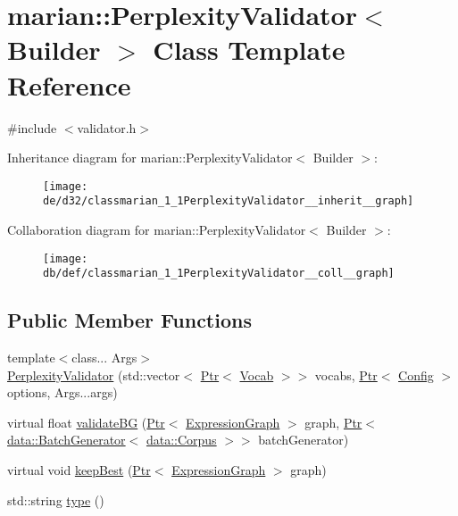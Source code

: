 \hypertarget{classmarian_1_1PerplexityValidator}{}\section{marian\+:\+:Perplexity\+Validator$<$ Builder $>$ Class Template Reference}
\label{classmarian_1_1PerplexityValidator}


{\ttfamily \#include $<$validator.\+h$>$}



Inheritance diagram for marian\+:\+:Perplexity\+Validator$<$ Builder $>$\+:
\nopagebreak
\begin{figure}[H]
\begin{center}
\leavevmode
\texttt{[image: de/d32/classmarian\_1\_1PerplexityValidator\_\_inherit\_\_graph]}
\end{center}
\end{figure}


Collaboration diagram for marian\+:\+:Perplexity\+Validator$<$ Builder $>$\+:
\nopagebreak
\begin{figure}[H]
\begin{center}
\leavevmode
\texttt{[image: db/def/classmarian\_1\_1PerplexityValidator\_\_coll\_\_graph]}
\end{center}
\end{figure}
\subsection*{Public Member Functions}
\begin{DoxyCompactItemize}
\item 
{\footnotesize template$<$class... Args$>$ }\\\hyperlink{classmarian_1_1PerplexityValidator_a9a6c1b5ec39f8b75678f438644679557}{Perplexity\+Validator} (std\+::vector$<$ \hyperlink{namespacemarian_ad1a373be43a00ef9ce35666145137b08}{Ptr}$<$ \hyperlink{classmarian_1_1Vocab}{Vocab} $>$$>$ vocabs, \hyperlink{namespacemarian_ad1a373be43a00ef9ce35666145137b08}{Ptr}$<$ \hyperlink{classmarian_1_1Config}{Config} $>$ options, Args...\+args)
\item 
virtual float \hyperlink{classmarian_1_1PerplexityValidator_a30a9da5e5a20b5f7f90643eb1ae85dac}{validate\+BG} (\hyperlink{namespacemarian_ad1a373be43a00ef9ce35666145137b08}{Ptr}$<$ \hyperlink{classmarian_1_1ExpressionGraph}{Expression\+Graph} $>$ graph, \hyperlink{namespacemarian_ad1a373be43a00ef9ce35666145137b08}{Ptr}$<$ \hyperlink{classmarian_1_1data_1_1BatchGenerator}{data\+::\+Batch\+Generator}$<$ \hyperlink{classmarian_1_1data_1_1Corpus}{data\+::\+Corpus} $>$$>$ batch\+Generator)
\item 
virtual void \hyperlink{classmarian_1_1PerplexityValidator_ab276447aa46c5f00fb3e559b2010a00c}{keep\+Best} (\hyperlink{namespacemarian_ad1a373be43a00ef9ce35666145137b08}{Ptr}$<$ \hyperlink{classmarian_1_1ExpressionGraph}{Expression\+Graph} $>$ graph)
\item 
std\+::string \hyperlink{classmarian_1_1PerplexityValidator_a1df91365d8eef33c49bbd487de8e244e}{type} ()
\end{DoxyCompactItemize}
